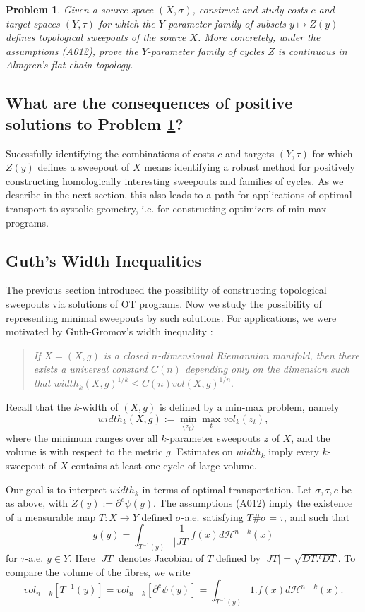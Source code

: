 \documentclass[12pt]{amsart}
\newtheorem{prob}{Problem}
\theoremstyle{remark}
\newcommand{\del}{\partial}
\newcommand{\sub}{\del^c \psi(y)}
\begin{document}
\begin{prob}
\label{alm}
Given a source space $(X, \sigma)$, construct and study costs $c$ and target spaces $(Y, \tau)$ for which the $Y$-parameter family of subsets $y\mapsto Z(y)$ defines topological sweepouts of the source $X$. More concretely, under the assumptions (A012), prove the $Y$-parameter family of cycles $Z$ is continuous in Almgren's flat chain topology. 
\end{prob}

\subsection{What are the consequences of positive solutions to Problem \ref{alm}?}
Sucessfully identifying the combinations of costs $c$ and targets $(Y, \tau)$ for which $Z(y)$ defines a sweepout of $X$ means identifying a robust method for positively constructing homologically interesting sweepouts and families of cycles. As we describe in the next section, this also leads to a path for applications of optimal transport to systolic geometry, i.e. for constructing optimizers of min-max programs. 

\subsection{Guth's Width Inequalities}
The previous section introduced the possibility of constructing topological sweepouts via solutions of OT programs. Now we study the possibility of representing minimal sweepouts by such solutions. For applications, we were motivated by Guth-Gromov's width inequality \cite{guth2009minimax}: 

\begin{quote} 
\emph{ If $X=(X,g)$ is a closed $n$-dimensional Riemannian manifold, then there exists a universal constant $C(n)$ depending only on the dimension such that $width_k(X,g)^{1/k}\leq C(n) vol(X,g)^{1/n}.$
} 
\end{quote} 

Recall that the $k$-width of $(X,g)$ is defined by a min-max problem, namely $$width_k(X,g):=\min_{\{z_t\}} \max_{t} vol_k(z_t),$$ where the minimum ranges over all $k$-parameter sweepouts $z$ of $X$, and the volume is with respect to the metric $g$. Estimates on $width_k$ imply every $k$-sweepout of $X$ contains at least one cycle of large volume. 

Our goal is to interpret $width_k$ in terms of optimal transportation.  Let $\sigma, \tau, c$ be as above, with $Z(y):=\sub$. The assumptions (A012) imply the existence of a measurable map $T: X\to Y$ defined $\sigma$-a.e. satisfying $T\# \sigma = \tau$, and such that $$g(y)=\int_{T^{-1}(y)} \frac{1}{|JT|} f(x) d\mathscr{H}^{n-k}(x) $$ for $\tau$-a.e. $y\in Y$. Here $|JT|$ denotes Jacobian of $T$ defined by $|JT|=\sqrt{DT . {}^t DT}$. To compare the volume of the fibres, we write $$vol_{n-k}[T^{-1}(y)]=vol_{n-k} [\sub]=\int_{T^{-1}(y)} 1 . f(x) d\mathscr{H}^{n-k}(x).$$ 
\end{document}
